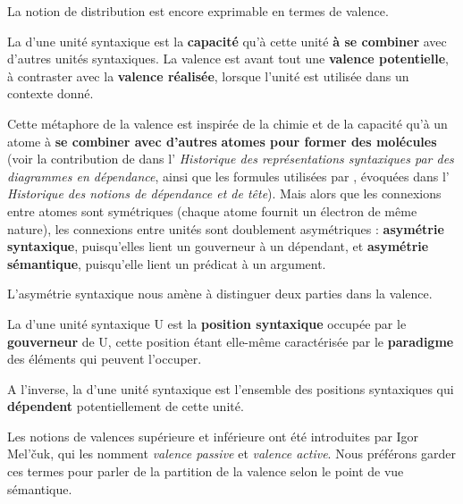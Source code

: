 La notion de distribution est encore exprimable en termes de valence.

\begin{styleLivreImportant}
La  d’une unité syntaxique est la \textbf{capacité} qu’à cette unité \textbf{à se combiner} avec d’autres unités syntaxiques. La valence est avant tout une \textbf{valence potentielle}, à contraster avec la \textbf{valence réalisée}, lorsque l’unité est utilisée dans un contexte donné.
\end{styleLivreImportant}

Cette métaphore de la valence est inspirée de la chimie et de la capacité qu’à un atome à \textbf{se combiner avec d’autres} \textbf{atomes pour former des molécules} (voir la contribution de \citet{Peirce1897} dans l’ \textit{Historique des représentations syntaxiques par des diagrammes en dépendance}, ainsi que les formules utilisées par \citet{Jespersen1937}, évoquées dans l’ \textit{Historique des notions de dépendance et de tête}). Mais alors que les connexions entre atomes sont symétriques (chaque atome fournit un électron de même nature), les connexions entre unités sont doublement asymétriques : \textbf{asymétrie syntaxique}, puisqu’elles lient un gouverneur à un dépendant, et \textbf{asymétrie sémantique}, puisqu’elle lient un prédicat à un argument.

L’asymétrie syntaxique nous amène à distinguer deux parties dans la valence.

\begin{styleLivreImportant}
La  d’une unité syntaxique U est la \textbf{position syntaxique} occupée par le \textbf{gouverneur} de U, cette position étant elle-même caractérisée par le \textbf{paradigme} des éléments qui peuvent l’occuper.
\end{styleLivreImportant}

\begin{styleLivreImportant}
A l’inverse, la  d’une unité syntaxique est l’ensemble des positions syntaxiques qui \textbf{dépendent} potentiellement de cette unité.
\end{styleLivreImportant}

Les notions de valences supérieure et inférieure ont été introduites par Igor Mel’čuk, qui les nomment \textit{valence passive} et \textit{valence active}. Nous préférons garder ces termes pour parler de la partition de la valence selon le point de vue sémantique.

